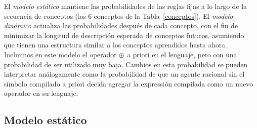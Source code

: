 
El \textit{modelo estático} mantiene las probabilidades de las reglas fijas a lo largo de la secuencia de conceptos (los 6 conceptos de la Tabla~\ref{conceptos}). El \textit{modelo dinámico} actualiza las probabilidades después de cada concepto, con el fin de minimizar la longitud de descripción esperada de conceptos futuros, asumiendo que tienen una estructura similar a los conceptos aprendidos hasta ahora. Incluimos en este modelo el operador $\oplus$ a priori en el lenguaje, pero con una probabilidad de ser utilizado muy baja. Cambios en esta probabilidad se pueden interpretar análogamente como la probabilidad de que un agente racional sin el símbolo compilado a priori decida agregar la expressión compilada como un nuevo operador en su lenguaje.


\subsection{Modelo estático}

